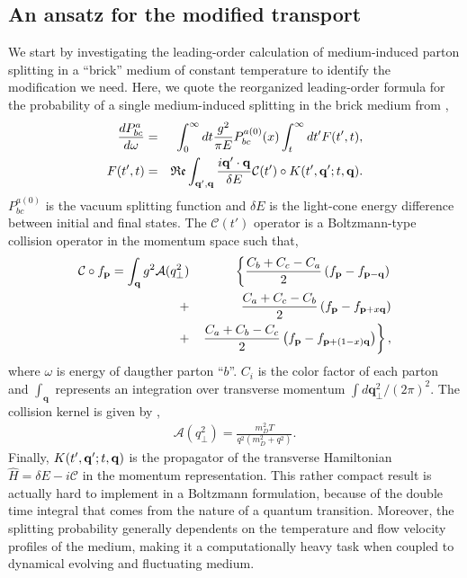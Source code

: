 \documentclass[aps, prc, reprint, amsmath, groupedaddress, nofootinbib]{revtex4-1}
\begin{document}
\subsection{An ansatz for the modified transport}
We start by investigating the leading-order calculation of medium-induced parton splitting in a ``brick'' medium of constant temperature to identify the modification we need.
Here, we quote the reorganized leading-order formula for the probability of a single medium-induced splitting in the brick medium from \cite{CaronHuot:2010bp},
\begin{eqnarray}
\frac{dP^{a}_{bc}}{d\omega} &=& \int_0^\infty dt \frac{g^2}{\pi E} P_{bc}^{a(0)}(x) \int_t^\infty dt'  F(t', t),
\label{eq:full-theory}
\\
F(t', t) &=& \mathfrak{Re} \int_{{\bf q}', {\bf q}} \frac{i {\bf q}'\cdot {\bf q}}{\delta E} \mathcal{C}(t') \circ K(t', {\bf q}'; t, {\bf q}).
\end{eqnarray}
$P_{bc}^{a(0)}$ is the vacuum splitting function and $\delta E$ is the light-cone energy difference between initial and final states. 
The $\mathcal{C}(t')$ operator is a Boltzmann-type collision operator in the momentum space such that,
\begin{eqnarray}
\mathcal{C}\circ f_{\mathbf{p}} = \int_{\bf q} g^2\mathcal{A}(q_\perp^2)
&&\left\{  \frac{C_b+C_c-C_a}{2}\left(f_{\bf p}-f_{{\bf p}-{\bf q}}\right) \right.\\\nonumber
 +&&    \frac{C_a+C_c-C_b}{2}\left(f_{\bf p}-f_{{\bf p}+x{\bf q}}\right) \\\nonumber
+&&  \left. \frac{C_a+C_b-C_c}{2}\left(f_{\bf p}-f_{{\bf p}+(1-x){\bf q}}\right)\right\},
\end{eqnarray}
where $\omega$ is energy of daugther parton ``$b$''.
$C_i$ is the color factor of each parton and $\int_{\mathbf{q}}$ represents an integration over transverse momentum $\int d\mathbf{q}_\perp^2/(2\pi)^2$.
The collision kernel is given by \cite{Aurenche:2002pd},
\begin{eqnarray}
\mathcal{A}(q_\perp^2) = \frac{m_D^2 T}{q^2\left(m_D^2+q^2\right)}.
\label{eq:kernel}
\end{eqnarray}
Finally, $K(t', {\bf q}'; t, {\bf q})$ is the propagator of the transverse  Hamiltonian $\hat{H} = \delta E - i\mathcal{C}$ in the momentum representation.
This rather compact result is actually hard to implement in a Boltzmann formulation, because of the double time integral that comes from the nature of a quantum transition.
Moreover, the splitting probability generally dependents on the temperature and flow velocity profiles of the medium, making it a computationally heavy task when coupled to dynamical evolving and fluctuating medium.
\end{document}
